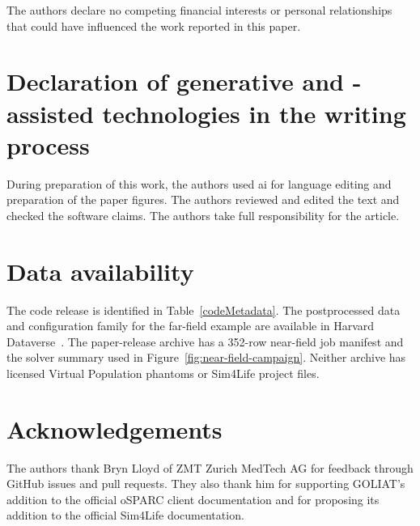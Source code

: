 \documentclass[final,5p,times,twocolumn]{elsarticle}
\begin{document}
The authors declare no competing financial interests or personal relationships that could have influenced the work reported in this paper.

\section*{Declaration of generative  and -assisted technologies in the writing process}

During preparation of this work, the authors used \gls{ai} for language editing and preparation of the paper figures. The authors reviewed and edited the text and checked the software claims. The authors take full responsibility for the article.

\section*{Data availability}

The code release is identified in Table~\ref{codeMetadata}. The postprocessed data and configuration family for the far-field example are available in Harvard Dataverse~\cite{GOLIATFarFieldData}. The paper-release archive has a 352-row near-field job manifest and the solver summary used in Figure~\ref{fig:near-field-campaign}. Neither archive has licensed Virtual Population phantoms or Sim4Life project files.

\section*{Acknowledgements}

The authors thank Bryn Lloyd of ZMT Zurich MedTech AG for feedback through GitHub issues and pull requests. They also thank him for supporting GOLIAT's addition to the official oSPARC client documentation and for proposing its addition to the official Sim4Life documentation.



\end{document}
